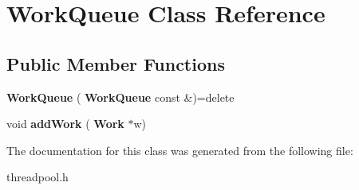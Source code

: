 \section{Work\+Queue Class Reference}
\label{classWorkQueue}
\subsection*{Public Member Functions}
\begin{DoxyCompactItemize}
\item 
\mbox{\label{classWorkQueue_a5e2cc92f81220cc0e62d61de671a3fcb}} 
{\bfseries Work\+Queue} (\textbf{ Work\+Queue} const \&)=delete
\item 
\mbox{\label{classWorkQueue_a78de73c878409db6a184b56332d7f27a}} 
void {\bfseries add\+Work} (\textbf{ Work} $\ast$w)
\end{DoxyCompactItemize}


The documentation for this class was generated from the following file\+:\begin{DoxyCompactItemize}
\item 
threadpool.\+h\end{DoxyCompactItemize}
